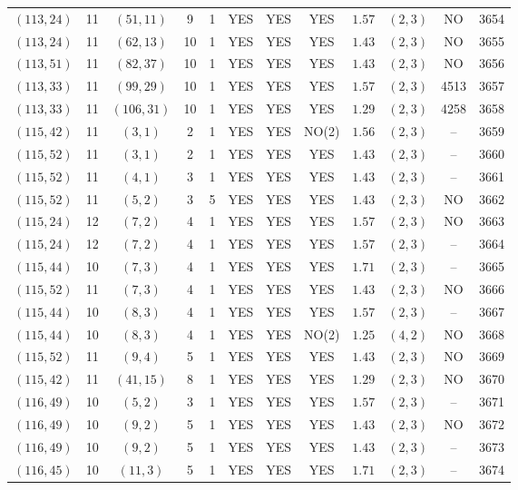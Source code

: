 \begin{longtable}{|c|c|c|c|c|c|c|c|c|c|c|c|}
$(113,24)$ & 11 & $(51,11)$ & 9 & 1 & YES & YES & YES & $1.57$ & $(2,3)$ & NO & 3654\\
$(113,24)$ & 11 & $(62,13)$ & 10 & 1 & YES & YES & YES & $1.43$ & $(2,3)$ & NO & 3655\\
$(113,51)$ & 11 & $(82,37)$ & 10 & 1 & YES & YES & YES & $1.43$ & $(2,3)$ & NO & 3656\\
$(113,33)$ & 11 & $(99,29)$ & 10 & 1 & YES & YES & YES & $1.57$ & $(2,3)$ & 4513 & 3657\\
$(113,33)$ & 11 & $(106,31)$ & 10 & 1 & YES & YES & YES & $1.29$ & $(2,3)$ & 4258 & 3658\\
$(115,42)$ & 11 & $(3,1)$ & 2 & 1 & YES & YES & NO(2) & $1.56$ & $(2,3)$ & -- & 3659\\
$(115,52)$ & 11 & $(3,1)$ & 2 & 1 & YES & YES & YES & $1.43$ & $(2,3)$ & -- & 3660\\
$(115,52)$ & 11 & $(4,1)$ & 3 & 1 & YES & YES & YES & $1.43$ & $(2,3)$ & -- & 3661\\
$(115,52)$ & 11 & $(5,2)$ & 3 & 5 & YES & YES & YES & $1.43$ & $(2,3)$ & NO & 3662\\
$(115,24)$ & 12 & $(7,2)$ & 4 & 1 & YES & YES & YES & $1.57$ & $(2,3)$ & NO & 3663\\
$(115,24)$ & 12 & $(7,2)$ & 4 & 1 & YES & YES & YES & $1.57$ & $(2,3)$ & -- & 3664\\
$(115,44)$ & 10 & $(7,3)$ & 4 & 1 & YES & YES & YES & $1.71$ & $(2,3)$ & -- & 3665\\
$(115,52)$ & 11 & $(7,3)$ & 4 & 1 & YES & YES & YES & $1.43$ & $(2,3)$ & NO & 3666\\
$(115,44)$ & 10 & $(8,3)$ & 4 & 1 & YES & YES & YES & $1.57$ & $(2,3)$ & -- & 3667\\
$(115,44)$ & 10 & $(8,3)$ & 4 & 1 & YES & YES & NO(2) & $1.25$ & $(4,2)$ & NO & 3668\\
$(115,52)$ & 11 & $(9,4)$ & 5 & 1 & YES & YES & YES & $1.43$ & $(2,3)$ & NO & 3669\\
$(115,42)$ & 11 & $(41,15)$ & 8 & 1 & YES & YES & YES & $1.29$ & $(2,3)$ & NO & 3670\\
$(116,49)$ & 10 & $(5,2)$ & 3 & 1 & YES & YES & YES & $1.57$ & $(2,3)$ & -- & 3671\\
$(116,49)$ & 10 & $(9,2)$ & 5 & 1 & YES & YES & YES & $1.43$ & $(2,3)$ & NO & 3672\\
$(116,49)$ & 10 & $(9,2)$ & 5 & 1 & YES & YES & YES & $1.43$ & $(2,3)$ & -- & 3673\\
$(116,45)$ & 10 & $(11,3)$ & 5 & 1 & YES & YES & YES & $1.71$ & $(2,3)$ & -- & 3674\\

\end{longtable}

